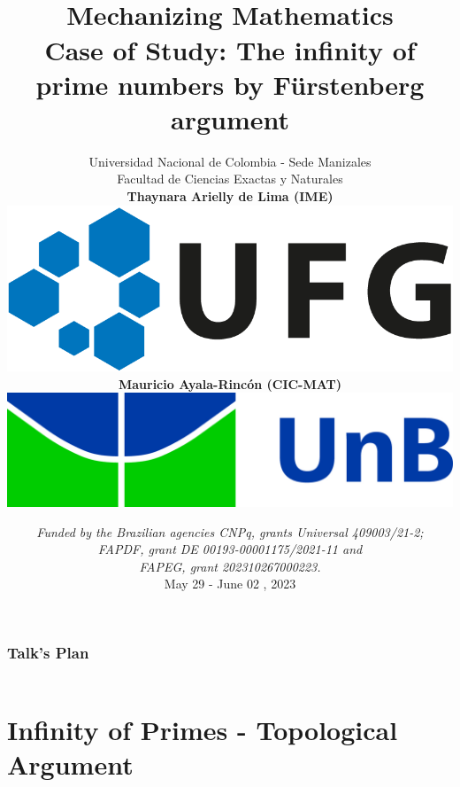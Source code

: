 \documentclass[10pt]{beamer}
\title
[Mechanizing Mathematics]
{\vspace{-5mm}
\\%
{\bf\Large Mechanizing Mathematics}\\
{\large Case of Study: The infinity of prime numbers by F\"urstenberg argument} \vspace{-.1cm}}
\author[M. Ayala-Rinc\'on (UnB) \& T. A. de Lima (UFG)]
{Universidad Nacional de Colombia - Sede Manizales \\
Facultad de Ciencias Exactas y Naturales\\[6mm]
\textbf{Thaynara Arielly de Lima
  (IME)}   \includegraphics[scale=.18]{ufg.png}\\
\textbf{Mauricio Ayala-Rinc\'on (CIC-MAT)} \includegraphics[scale=.03]{unb.jpg}
\vspace{-.8cm}}
\date[Universidad Nacional de Colombia - Sede Manizales]{{\scriptsize\it Funded by the Brazilian agencies CNPq, grants Universal 409003/21-2; \\ FAPDF, grant DE 00193-00001175/2021-11 and \\ FAPEG, grant 202310267000223.}
\\ May 29 - June 02 ,
  2023}
\begin{document}
\begin{frame}
\maketitle
\end{frame}
\begin{frame}
\frametitle{Talk's Plan}
\begin{columns}
\begin{column}{10cm}
\tableofcontents
\end{column}
\end{columns}
\end{frame}





\section{ Infinity of Primes - Topological Argument}
\end{document}
